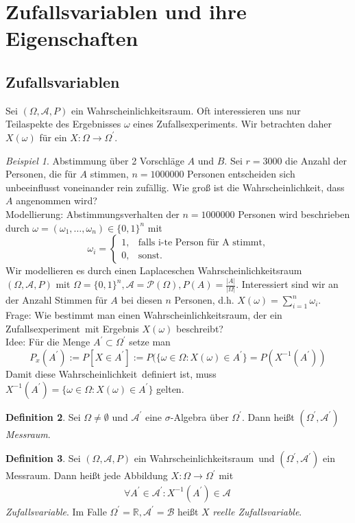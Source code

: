 \documentclass[a4paper,12pt,fleqn]{scrartcl}
\newcommand{\R}{\mathbb{R}}
\newcommand{\m}[1]{\mathcal{ #1 }}
\newcommand{\ZE}{Zufallsexperiment}
\newcommand{\WR}{Wahrscheinlichkeitsraum}
\newcommand{\Wk}{Wahrscheinlichkeit}
\newcommand{\ZV}{Zufallsvariable}
\theoremstyle{definition}
\newtheorem{definition}{Definition}[section]
\theoremstyle{plain}
\theoremstyle{remark}
\newtheorem{beispiel}[definition]{Beispiel}
\begin{document}
\section{Zufallsvariablen und ihre Eigenschaften}
\subsection{Zufallsvariablen}
Sei $( \Omega , \m{A} , P)$ ein \WR. Oft interessieren uns nur Teilaspekte des Ergebnisses $\omega$ eines \ZE s. Wir betrachten daher $X( \omega ) $ für ein $X : \Omega \rightarrow \Omega^\prime$.
\begin{beispiel}
Abstimmung über 2 Vorschläge $A$ und $B$. Sei $r=3000$ die Anzahl der Personen, die für $A$ stimmen, $n=1000000$ Personen entscheiden sich unbeeinflusst voneinander rein zufällig. Wie groß ist die \Wk, dass $A$ angenommen wird? \\
Modellierung: Abstimmungsverhalten der $n=1000000$ Personen wird beschrieben durch $\omega = ( \omega_1, \ldots , \omega_n) \in \{ 0,1 \}^n$ mit 
\[\omega_i =\begin{cases}1,&\text{falls i-te Person für A stimmt,}\\0,&\text{sonst.}\end{cases}\]
Wir modellieren es durch einen Laplaceschen \WR \, $(\Omega , \m{A} , P)$ mit $ \Omega = \{ 0,1 \}^n , \m{A} = \m{P}(\Omega) , P(A) = \frac{|A|}{| \Omega|}$. Interessiert sind wir an der Anzahl Stimmen für $A$ bei diesen $n$ Personen, d.h. $X( \omega) = \sum_{i=1}^{n}{ \omega_i }$. \\
Frage: Wie bestimmt man einen \WR, der ein \ZE \, mit Ergebnis $X( \omega)$ beschreibt? \\
Idee: Für die Menge $A^\prime \subset \Omega^\prime$ setze man 
\[P_x(A^\prime) := P[X \in A^\prime] := P( \{ \omega \in \Omega : X( \omega ) \in A^\prime \} = P(X^{-1}(A^\prime))\]
Damit diese \Wk \, definiert ist, muss $X^{-1}(A^\prime) = \{ \omega \in \Omega : X( \omega ) \in A^\prime \}$ gelten.
\end{beispiel}
\begin{definition}
Sei $\Omega \neq \emptyset$ und $\m{A}^\prime$ eine $\sigma$-Algebra über $\Omega^\prime$. Dann heißt $(\Omega^\prime, \m{A}^\prime)$ \emph{Messraum}.
\end{definition}
\begin{definition}
Sei $( \Omega , \m{A} , P)$ ein \WR \, und $(\Omega^\prime, \m{A}^\prime)$ ein Messraum. Dann heißt jede Abbildung $X: \Omega \rightarrow \Omega^\prime$ mit
\begin{align*}
 \forall A^\prime \in \m{A}^\prime :X^{-1}(A^\prime) \in \m{A} \,  \tag{*}
\end{align*} 
\emph{Zufallsvariable}. Im Falle $\Omega^\prime = \R, \m{A}^\prime = \m{B}$ heißt $X$ \emph{reelle \ZV}.
\end{definition}
\end{document}
